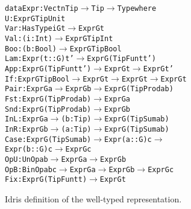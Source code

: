 \begin{figure}
\begin{alltt}
  data Expr : Vect n Tip \(\rightarrow\) Tip \(\rightarrow\) Type where
    U    : Expr G TipUnit
    Var  : HasType i G t \(\rightarrow\) Expr G t
    Val  : (i : Int) \(\rightarrow\) Expr G TipInt
    Boo  : (b : Bool) \(\rightarrow\) Expr G TipBool
    Lam  : Expr (t :: G) t' \(\rightarrow\) Expr G (TipFun t t')
    App  : Expr G (TipFun t t') \(\rightarrow\) Expr G t \(\rightarrow\) Expr G t'
    If   : Expr G TipBool \(\rightarrow\) Expr G t \(\rightarrow\) Expr G t \(\rightarrow\) Expr G t
    Pair : Expr G a \(\rightarrow\) Expr G b \(\rightarrow\) Expr G (TipProd a b)
    Fst  : Expr G (TipProd a b) \(\rightarrow\) Expr G a
    Snd  : Expr G (TipProd a b) \(\rightarrow\) Expr G b
    InL  : Expr G a \(\rightarrow\) (b: Tip) \(\rightarrow\) Expr G (TipSum a b)
    InR  : Expr G b \(\rightarrow\) (a: Tip) \(\rightarrow\) Expr G (TipSum a b)
    Case : Expr G (TipSum a b) \(\rightarrow\) Expr (a :: G) c \(\rightarrow\)
           Expr (b :: G) c \(\rightarrow\) Expr G c
    OpU  : UnOp a b \(\rightarrow\) Expr G a \(\rightarrow\) Expr G b
    OpB  : BinOp a b c \(\rightarrow\) Expr G a \(\rightarrow\) Expr G b \(\rightarrow\) Expr G c
    Fix  : Expr G (TipFun t t) \(\rightarrow\) Expr G t
\end{alltt}
\caption{Idris definition of the well-typed representation.}
\label{fig:idris-def-expr-lang}
\end{figure}






